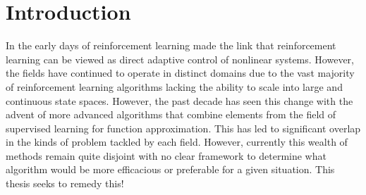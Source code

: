 \chapter{Introduction}

In the early days of reinforcement learning \cite{SBW92} made the link that reinforcement learning can be viewed as direct adaptive control of nonlinear systems. However, the fields have continued to operate in distinct domains due to the vast majority of reinforcement learning algorithms lacking the ability to scale into large and continuous state spaces. However, the past decade has seen this change with the advent of more advanced algorithms that combine elements from the field of supervised learning for function approximation. This has led to significant overlap in the kinds of problem tackled by each field. However, currently this wealth of methods remain quite disjoint with no clear framework to determine what algorithm would be more efficacious or preferable for a given situation. This thesis seeks to remedy this!